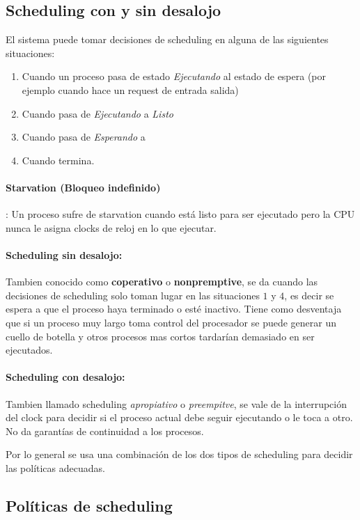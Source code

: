 	\subsection{Scheduling con y sin desalojo}
	
	El sistema puede tomar decisiones de scheduling en alguna de las siguientes situaciones:
	\begin{enumerate}
		\item Cuando un proceso pasa de estado \textit{Ejecutando} al estado de espera (por ejemplo cuando hace un request de entrada salida)
		\item Cuando pasa de \textit{Ejecutando} a \textit{Listo}
		\item Cuando pasa de \textit{Esperando} a 
		\item Cuando termina.
	\end{enumerate}
	
	\paragraph{Starvation (Bloqueo indefinido)}: Un proceso sufre de starvation cuando está listo para ser ejecutado pero la CPU nunca le asigna clocks de reloj en lo que ejecutar.
	
	\paragraph{Scheduling sin desalojo:} Tambien conocido como \textbf{coperativo} o \textbf{nonpremptive}, se da cuando las decisiones de scheduling solo toman lugar en las situaciones $1$ y $4$, es decir se espera a que el proceso haya terminado o esté inactivo. Tiene como desventaja que si un proceso muy largo toma control del procesador se puede generar un cuello de botella y otros procesos mas cortos tardarían demasiado en ser ejecutados.
	
	\paragraph{Scheduling con desalojo:} Tambien llamado scheduling \textit{apropiativo} o \textit{preempitve}, se vale de la interrupción del clock para decidir si el proceso actual debe seguir ejecutando o le toca a otro. No da garantías de continuidad a los procesos.
	
	Por lo general se usa una combinación de los dos tipos de scheduling para decidir las políticas adecuadas.

	\subsection{Políticas de scheduling}
